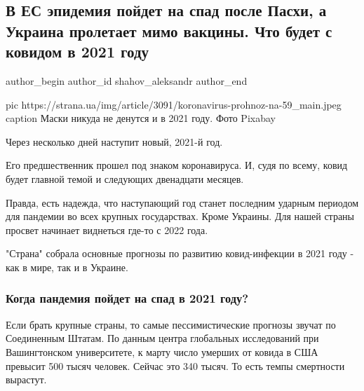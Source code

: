  
 
 
 
 
 
\subsection{В ЕС эпидемия пойдет на спад после Пасхи, а Украина пролетает мимо вакцины. Что будет с ковидом в 2021 году}
\label{sec:28_12_2020.news.ua.strana.shahov_aleksandr.1.ukraina_covid_vaccine}
\ifcmt
	author_begin
   author_id shahov_aleksandr
	author_end
\fi
{}

\ifcmt
pic https://strana.ua/img/article/3091/koronavirus-prohnoz-na-59_main.jpeg
caption Маски никуда не денутся и в 2021 году. Фото Pixabay
\fi

Через несколько дней наступит новый, 2021-й год.

Его предшественник прошел под знаком коронавируса. И, судя по всему, ковид
будет главной темой и следующих двенадцати месяцев. 

Правда, есть надежда, что наступающий год станет последним ударным периодом для
пандемии во всех крупных государствах. Кроме Украины. Для нашей страны просвет
начинает виднеться где-то с 2022 года. 

"Страна" собрала основные прогнозы по развитию ковид-инфекции в 2021 году - как
в мире, так и в Украине. 

\subsubsection{Когда пандемия пойдет на спад в 2021 году?}

Если брать крупные страны, то самые пессимистические прогнозы звучат по
Соединенным Штатам. По данным центра глобальных исследований при Вашингтонском
университете, к марту число умерших от ковида в США превысит 500 тысяч человек.
Сейчас это 340 тысяч. То есть темпы смертности вырастут.

